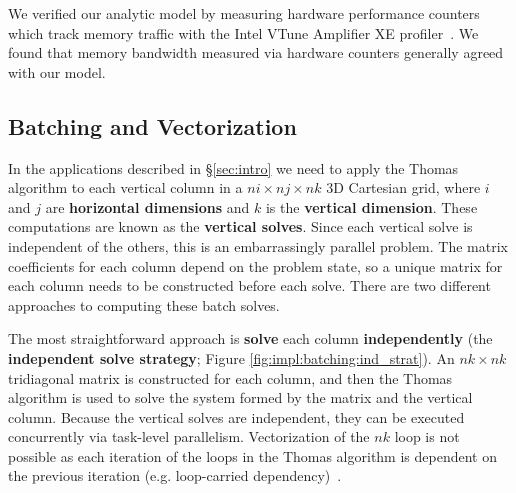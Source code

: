 \documentclass[10pt, conference, compsocconf]{IEEEtran}
\begin{document}
We verified our analytic model by measuring hardware performance counters which
  track memory traffic with the Intel VTune Amplifier XE
  profiler~\cite{intel_vtune_amplifier}.
We found that memory bandwidth measured via hardware counters generally agreed
  with our model. 

\subsection{Batching and Vectorization}
\label{sec:impl:batching_and_parallelism}

In the applications described in \S\ref{sec:intro} we need to apply the
  Thomas algorithm to each vertical column in a \(ni \times nj \times nk\)
  3D Cartesian grid, where \(i\) and \(j\) are \textbf{horizontal dimensions}
  and \(k\) is the \textbf{vertical dimension}.
These computations are known as the \textbf{vertical solves}.
Since each vertical solve is independent of the others, this is an
  embarrassingly parallel problem.
The matrix coefficients for each column depend on the problem state, so a
  unique matrix for each column needs to be constructed before each solve.
There are two different approaches to computing these batch solves.

The most straightforward approach is \textbf{solve} each column
  \textbf{independently} (the \textbf{independent solve strategy}; Figure
  \ref{fig:impl:batching:ind_strat}).
An \(nk \times nk\) tridiagonal matrix is constructed for each column, and then
  the Thomas algorithm is used to solve the system formed by the matrix and the
  vertical column.
Because the vertical solves are independent, they can be executed concurrently
  via task-level parallelism.
Vectorization of the \(nk\) loop is not possible as each iteration of the loops
  in the Thomas algorithm is dependent on the previous iteration (e.g.
  loop-carried dependency)~\cite{pipelined_thomas_algorithm}.
\end{document}
